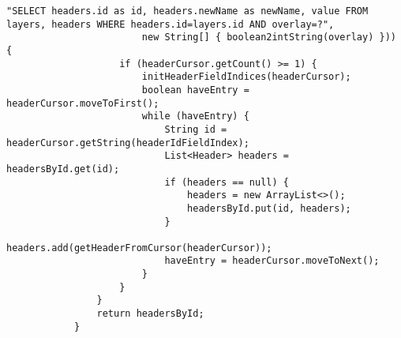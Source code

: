 \begin{enumerate}
\begin{itemize}
\begin{lstlisting}[style=Java, caption=Nouveau code]
                        "SELECT headers.id as id, headers.newName as newName, value FROM layers, headers WHERE headers.id=layers.id AND overlay=?",
                        new String[] { boolean2intString(overlay) })) {
                    if (headerCursor.getCount() >= 1) {
                        initHeaderFieldIndices(headerCursor);
                        boolean haveEntry = headerCursor.moveToFirst();
                        while (haveEntry) {
                            String id = headerCursor.getString(headerIdFieldIndex);
                            List<Header> headers = headersById.get(id);
                            if (headers == null) {
                                headers = new ArrayList<>();
                                headersById.put(id, headers);
                            }
                            headers.add(getHeaderFromCursor(headerCursor));
                            haveEntry = headerCursor.moveToNext();
                        }
                    }
                }
                return headersById;
            }
        \end{lstlisting}
          \end{itemize}

\end{enumerate}
